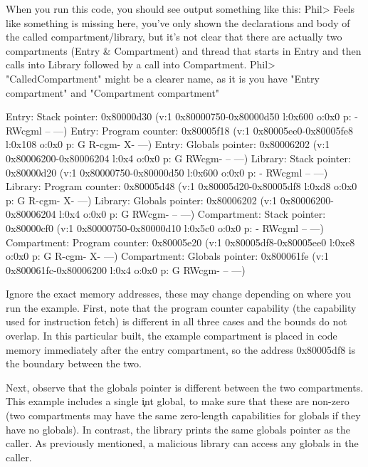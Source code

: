 \codelisting[filename=examples/library_or_compartment/library.cc,marker=library_implementation,label=lst:printcompartmentregisters,caption="A simple print function to introspect compartment state."]{}

When you run this code, you should see output something like this:
Phil>  Feels like something is missing here, you've only shown the declarations and body of the called compartment/library, but it's not clear that there are actually two compartments (Entry & Compartment) and thread that starts in Entry and then calls into Library followed by a call into Compartment.
Phil> "CalledCompartment" might be a clearer name, as it is you have "Entry compartment" and "Compartment compartment" 

\begin{console}
Entry: Stack pointer: 0x80000d30 (v:1 0x80000750-0x80000d50 l:0x600 o:0x0 p: - RWcgml -- ---)
Entry: Program counter: 0x80005f18 (v:1 0x80005ee0-0x80005fe8 l:0x108 o:0x0 p: G R-cgm- X- ---)
Entry: Globals pointer: 0x80006202 (v:1 0x80006200-0x80006204 l:0x4 o:0x0 p: G RWcgm- -- ---)
Library: Stack pointer: 0x80000d20 (v:1 0x80000750-0x80000d50 l:0x600 o:0x0 p: - RWcgml -- ---)
Library: Program counter: 0x80005d48 (v:1 0x80005d20-0x80005df8 l:0xd8 o:0x0 p: G R-cgm- X- ---)
Library: Globals pointer: 0x80006202 (v:1 0x80006200-0x80006204 l:0x4 o:0x0 p: G RWcgm- -- ---)
Compartment: Stack pointer: 0x80000cf0 (v:1 0x80000750-0x80000d10 l:0x5c0 o:0x0 p: - RWcgml -- ---)
Compartment: Program counter: 0x80005e20 (v:1 0x80005df8-0x80005ee0 l:0xe8 o:0x0 p: G R-cgm- X- ---)
Compartment: Globals pointer: 0x800061fe (v:1 0x800061fc-0x80006200 l:0x4 o:0x0 p: G RWcgm- -- ---)
\end{console}

Ignore the exact memory addresses, these may change depending on where you run the example.
First, note that the program counter capability (the capability used for instruction fetch) is different in all three cases and the bounds do not overlap.
In this particular built, the example compartment is placed in code memory immediately after the entry compartment, so the address 0x80005df8 is the boundary between the two.

Next, observe that the globals pointer is different between the two compartments.
This example includes a single \c{int} global, to make sure that these are non-zero (two compartments may have the same zero-length capabilities for globals if they have no globals).
In contrast, the library prints the same globals pointer as the caller.
As previously mentioned, a malicious library can access any globals in the caller.

